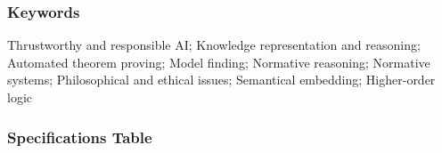 \documentclass{article}
\newcommand{\comment}[1]{
}
\begin{document}
\comment{
[The Abstract should describe the data collection process, the analysis performed, the data, and their reuse potential. It should not provide conclusions or interpretive insights. If your article is being submitted via another Elsevier journal as a co-submission, please cite this research article in the abstract (title, or doi, and reference number only, e.g. “Title” [1]), and point the reader there for interpretation. \\
Min 100 words - Max 500 words] 
}



\subsubsection*{Keywords}
Thrustworthy and responsible AI; Knowledge representation and
reasoning; Automated theorem proving; Model finding; Normative
reasoning; Normative systems; Philosophical and ethical issues;
Semantical embedding; Higher-order logic

\comment{
[Include 4-8 keywords (or phrases) to facilitate others finding your article online. Tip: Try Google Scholar to see what terms are most common in your field. In biomedical fields, MeSH terms are a good ‘common vocabulary’ to draw from]
}



\subsubsection*{Specifications Table} 

\comment{
[Every section of this table is mandatory. Please enter information in the right-hand column and remove all the instructions]
}
\end{document}
